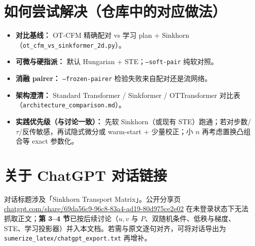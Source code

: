\documentclass[UTF8]{ctexart}
\begin{document}
\section{如何尝试解决（仓库中的对应做法）}

\begin{itemize}
  \item \textbf{对比基线：} OT-CFM 精确配对 vs 学习 plan + Sinkhorn（\texttt{ot\_cfm\_vs\_sinkformer\_2d.py}）。
  \item \textbf{可微与硬指派：} 默认 Hungarian + STE；\texttt{--soft-pair} 纯软对照。
  \item \textbf{消融 pairer：} \texttt{--frozen-pairer} 检验失败来自配对还是流网络。
  \item \textbf{架构澄清：} Standard Transformer / Sinkformer / OTTransformer 对比表（\texttt{architecture\_comparison.md}）。
  \item \textbf{实践优先级（与讨论一致）：} 先软 Sinkhorn（或现有 STE）跑通；若对步数/$\tau$/反传敏感，再试隐式微分或 warm-start + 少量校正；小 $n$ 再考虑置换凸组合等 exact 参数化。
\end{itemize}

\section{关于 ChatGPT 对话链接}

对话标题涉及「Sinkhorn Transport Matrix」。公开分享页
\href{https://chatgpt.com/share/69da56c9-96c8-83a4-ad19-80d975ce2e02}{chatgpt.com/share/69da56c9-96c8-83a4-ad19-80d975ce2e02}
在未登录状态下无法抓取正文；\textbf{第 3--4 节}已按后续讨论（$u,v$ 与 $P$、双随机条件、低秩与梯度、STE、学习投影器）并入本文档。若需与原文逐句对齐，可将对话导出为 \texttt{sumerize\_latex/chatgpt\_export.txt} 再增补。
\end{document}
